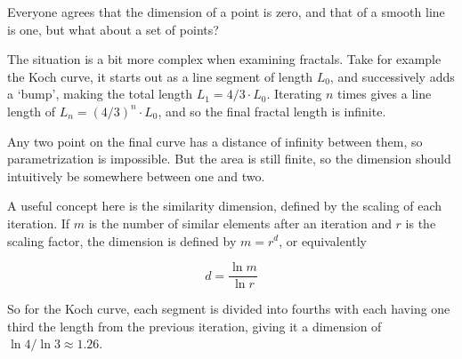 Everyone agrees that the dimension of a point is zero, and that of a smooth line is one, but what about a set of points? 

The situation is a bit more complex when examining fractals. Take for example the Koch curve, it starts out as a line segment of length $L_0$, and successively adds a `bump', making the total length $L_1 = 4/3 \cdot L_0$. Iterating $n$ times gives a line length of $L_n = {(4 / 3)}^n \cdot L_0$, and so the final fractal length is infinite. 

Any two point on the final curve has a distance of infinity between them, so parametrization is impossible. But the area is still finite, so the dimension should intuitively be somewhere between one and two.

A useful concept here is the similarity dimension, defined by the scaling of each iteration. If $m$ is the number of similar elements after an iteration and $r$ is the scaling factor, the dimension is defined by $m = r^d$, or equivalently

\begin{equation}
	d = \frac{\ln m}{\ln r}
\end{equation}

So for the Koch curve, each segment is divided into fourths with each having one third the length from the previous iteration, giving it a dimension of $\ln 4 / \ln 3 \approx 1.26$.

